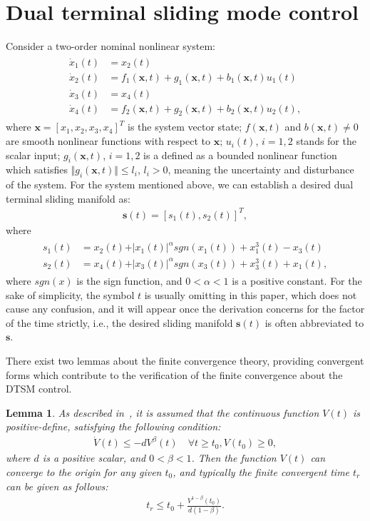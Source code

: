 \documentclass[3p]{elsarticle}
\theoremstyle{plain}
\newtheorem{mylem}{Lemma}
\theoremstyle{remark}
\begin{document}
\section{Dual terminal sliding mode control}\label{sec:2}
Consider a two-order nominal nonlinear system:
\begin{align}
\begin{split}
\dot x_1(t) &= x_2(t)\\
\dot x_2(t) &= f_1(\bm x,t)+g_1(\bm x,t)+b_1(\bm x,t)u_1(t)\\
\dot x_3(t) &= x_4(t)\\
\dot x_4(t) &= f_2(\bm x,t)+g_2(\bm x,t)+b_2(\bm x,t)u_2(t),\label{eq:two order system}
\end{split}
\end{align}
where $\bm x = [x_1,x_2,x_3,x_4]^T$ is the system vector state; $f(\bm x,t)$ and $b(\bm x,t)\neq 0$ are smooth nonlinear functions with respect to $\bm x$; $u_i(t)$, $i=1,2$ stands for the scalar input; $g_i(\bm x,t)$, $i=1,2$  is a defined as a bounded nonlinear function which satisfies $\Vert g_i(\bm x,t)\Vert\le l_i$, $l_i>0$, meaning the uncertainty and disturbance of the system. For the system mentioned above, we can establish a desired dual terminal sliding manifold as:
\begin{align}
\bm s(t) = [s_1(t),s_2(t)]^T,
\end{align}
where
\begin{align}
\begin{split}
s_1(t) &= x_2(t)+\vert x_1(t)\vert^{\alpha} sgn(x_1(t))+x_1^3(t)-x_3(t)\\
s_2(t) &= x_4(t)+\vert x_3(t)\vert^{\alpha} sgn(x_3(t))+x_3^3(t)+x_1(t),\label{eq:dual sliding manifold}
\end{split}
\end{align}
where $sgn(x)$ is the sign function, and $0<\alpha<1$ is a positive constant. For the sake of simplicity, the symbol $t$ is usually omitting in this paper, which does not cause any confusion, and it will appear once the derivation concerns for the factor of the time strictly, i.e., the desired sliding manifold $\bm s(t)$ is often abbreviated to $\bm s$.\par
There exist two lemmas about the finite convergence theory, providing convergent forms which contribute to the verification of the finite convergence about the DTSM control.
\begin{mylem}
As described in~\cite{moulay2006finite}, it is assumed that the continuous function $V(t)$ is positive-define, satisfying the following condition:
\begin{align}
\dot V(t)\le -dV^\beta(t)\quad\forall t\ge t_0, V(t_0)\ge 0,
\end{align}
where $d$ is a positive scalar, and $0<\beta<1$. Then the function $V(t)$ can converge to the origin for any given $t_0$, and typically the finite convergent time $t_r$ can be given as follows:
\begin{align}
t_r \le t_0+\frac{V^{1-\beta}(t_0)}{d(1-\beta)}.
\end{align}\label{lemma:1}
\end{mylem}
\end{document}
